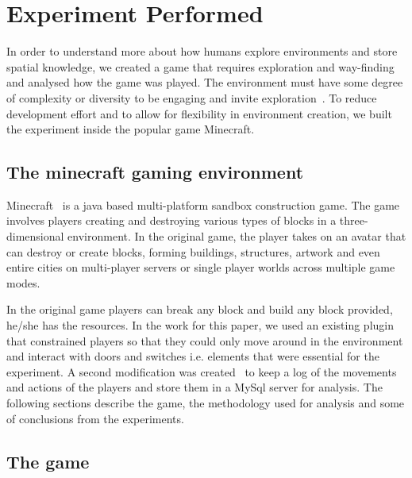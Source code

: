 
\section{Experiment Performed} %
\label{sec:experiment_performed_minecraft}

In order to understand more about how humans explore environments and store spatial knowledge, we created a game that requires  exploration and way-finding and analysed how the game was played. The environment must have some degree of complexity or diversity to be engaging and invite exploration~\cite{kaplan1983cognition}. To reduce development effort and to allow for flexibility in environment creation, we built the experiment inside the popular game Minecraft.

\subsection{The minecraft gaming environment}
\label{sec:the_minecraft_gaming_environment}

Minecraft~\cite{Minecraft} is a java based multi-platform sandbox construction game. The game involves players creating and destroying various types of blocks in a three-dimensional environment. In the original game, the player takes on an avatar that can destroy or create blocks, forming buildings, structures, artwork and even entire cities on multi-player servers or single player worlds across multiple game modes.



In the original game players can break any block and build any block provided, he/she has the resources. In the work for this paper, we used an existing plugin~\cite{BukkitPermissions} that constrained players so that they could only move around in the environment and interact with doors and switches i.e. elements that were essential for the experiment. A second modification was created~\cite{MyStatisticsPlugin} to keep a log of the movements and actions of the players and store them in a MySql server for analysis. The following sections describe the game, the methodology used for analysis and some of conclusions from the experiments.



\subsection{The game}
\label{sec:the_game}

